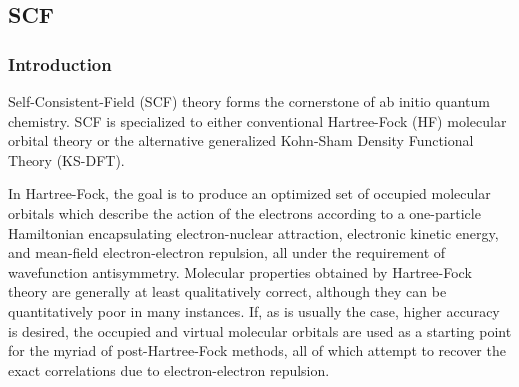 \subsection{SCF} \label{scf}

\subsubsection{Introduction}

Self-Consistent-Field (SCF) theory forms the cornerstone of ab initio quantum
chemistry. SCF is specialized to either conventional Hartree-Fock (HF) molecular
orbital theory or the alternative generalized Kohn-Sham Density Functional
Theory (KS-DFT). 

In Hartree-Fock, the goal is to produce an optimized set of occupied molecular
orbitals which describe the action of the electrons according to a one-particle
Hamiltonian encapsulating electron-nuclear attraction, electronic kinetic
energy, and mean-field electron-electron repulsion, all under the requirement of
wavefunction antisymmetry. Molecular properties obtained by Hartree-Fock theory
are generally at least qualitatively correct, although they can be
quantitatively poor in many instances. If, as is usually the case, higher
accuracy is desired, the occupied and virtual molecular orbitals are used as a
starting point for the myriad of post-Hartree-Fock methods, all of which attempt
to recover the exact correlations due to electron-electron repulsion.  

